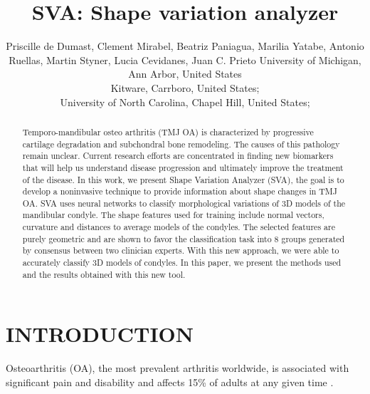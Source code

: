 \documentclass[]{spie}  %
\title{SVA: Shape variation analyzer}
\author{Priscille de Dumast\supit{a}, Clement Mirabel\supit{a}, Beatriz Paniagua\supit{b}, Marilia Yatabe\supit{a}, Antonio Ruellas\supit{a},
Martin Styner\supit{c}, Lucia Cevidanes\supit{a}, Juan C. Prieto\supit{c}
\skiplinehalf
\supit{a}University of Michigan, Ann Arbor, United States \\
\supit{b}Kitware, Carrboro, United States; \\
\supit{c}University of North Carolina, Chapel Hill, United States;
}
\begin{document}
 
  \maketitle 

\begin{abstract}

Temporo-mandibular osteo arthritis (TMJ OA)
is characterized by progressive cartilage degradation and subchondral bone remodeling. The causes of this pathology remain 
unclear. Current research efforts are concentrated in finding new biomarkers
that will help us understand disease progression and ultimately improve the treatment of the disease. 
In this work, we present Shape Variation Analyzer (SVA), the goal is to develop a noninvasive technique to provide information about shape changes in TMJ OA. 
SVA uses neural networks to classify morphological variations of 3D models of the mandibular condyle. 
The shape features used for training include normal vectors, curvature and distances to average models of the condyles. 
The selected features are purely geometric and are shown to favor the classification task into 8 groups 
generated by consensus between two clinician experts. 
With this new approach, we were able to accurately classify 3D models of condyles. 
In this paper, we present the methods used and the results obtained with this new tool. 

\end{abstract}



\section{INTRODUCTION}
\label{sec:intro}  %

Osteoarthritis (OA), the most prevalent arthritis worldwide, is associated with significant pain and disability and affects 15\% of adults at any given time \cite{kalladka2014temporomandibular}. 
\end{document}
